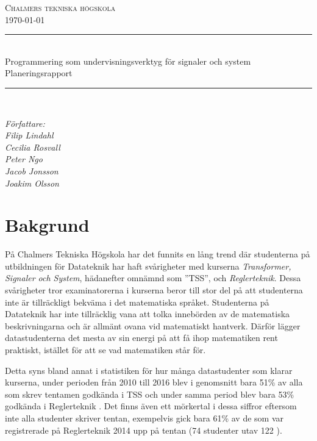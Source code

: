 \documentclass{article}
\begin{document}
\begin{titlepage} \newcommand{\HRule}{\rule{\linewidth}{0.3mm}}
\center
\textsc{\Large Chalmers tekniska högskola}\\[0.05cm]
\normalsize \today

\HRule \\[0.08cm]
{\large  Programmering som undervisningsverktyg för signaler och system \\ \normalsize{Planeringsrapport}}\\[0.08cm] %
\HRule \\[0.3cm]

\vfill

\begin{flushleft} \small
    \emph{Författare: \\
    \quad Filip Lindahl\\
    \quad Cecilia Rosvall\\
    \quad Peter Ngo\\
    \quad Jacob Jonsson\\
    \quad Joakim Olsson\\}
\end{flushleft}
\end{titlepage}
\newpage
\tableofcontents
\newpage

\section{Bakgrund}
På Chalmers Tekniska Högskola har det funnits en lång trend
där studenterna på utbildningen för Datateknik har haft
svårigheter med kurserna \textit{Transformer, Signaler och System},
hädanefter omnämnd som ''TSS'', och \textit{Reglerteknik}.
Dessa svårigheter tror examinatorerna i kurserna beror till
stor del på att studenterna inte är tillräckligt bekväma
i det matematiska språket.
Studenterna på Datateknik har inte tillräcklig vana att
tolka innebörden av de matematiska beskrivningarna och är
allmänt ovana vid matematiskt hantverk.
Därför lägger datastudenterna det mesta av sin energi
på att få ihop matematiken rent praktiskt,
istället för att se vad matematiken står för.

Detta syns bland annat i statistiken för hur många
datastudenter som klarar kurserna, under perioden från
2010 till 2016 blev i genomsnitt bara 51\% av alla som skrev
tentamen godkända i TSS och under samma period blev
bara 53\% godkända i Reglerteknik \cite{tentastatistik}.
Det finns även ett mörkertal i dessa siffror eftersom inte alla
studenter skriver tentan, exempelvis gick bara 61\% av de som var
registrerade på Reglerteknik 2014 upp på tentan (74 studenter utav 122
\cite{kursinformation:ere102:14-15}).
\end{document}
